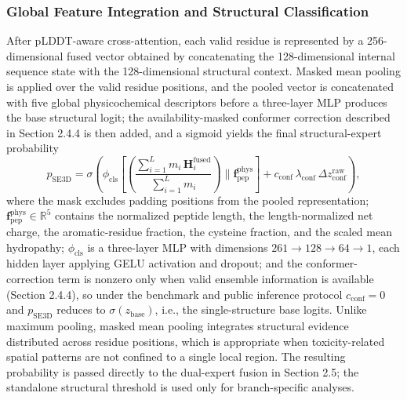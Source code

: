 \documentclass[12pt]{article}
\begin{document}
\subsubsection{Global Feature Integration and Structural Classification}
After pLDDT-aware cross-attention, each valid residue is represented by a
256-dimensional fused vector obtained by concatenating the 128-dimensional
internal sequence state with the 128-dimensional structural context. Masked
mean pooling is applied over the valid residue positions, and the pooled
vector is concatenated with five global physicochemical descriptors before a
three-layer MLP produces the base structural logit; the availability-masked
conformer correction described in Section 2.4.4 is then added, and a sigmoid
yields the final structural-expert probability
\begin{equation}
    p_{\mathrm{SE3D}} = \sigma\left(\phi_{\mathrm{cls}}\left[
    \left(\frac{\sum_{i=1}^{L} m_i\, \mathbf H^{\mathrm{fused}}_i}
    {\sum_{i=1}^{L} m_i}\right) \parallel
    \mathbf f_{\mathrm{pep}}^{\mathrm{phys}}\right] +
    c_{\mathrm{conf}}\, \lambda_{\mathrm{conf}}\,
    \Delta z_{\mathrm{conf}}^{\mathrm{raw}}\right),
    \label{eq:se3d_prob}
\end{equation}
where the mask excludes padding positions from the pooled representation;
$\mathbf f_{\mathrm{pep}}^{\mathrm{phys}} \in \mathbb{R}^{5}$ contains the
normalized peptide length, the length-normalized net charge, the
aromatic-residue fraction, the cysteine fraction, and the scaled mean
hydropathy; $\phi_{\mathrm{cls}}$ is a three-layer MLP with dimensions
$261 \rightarrow 128 \rightarrow 64 \rightarrow 1$, each hidden layer applying
GELU activation and dropout; and the conformer-correction term is nonzero
only when valid ensemble information is available (Section 2.4.4), so under
the benchmark and public inference protocol $c_{\mathrm{conf}} = 0$ and
$p_{\mathrm{SE3D}}$ reduces to $\sigma(z_{\mathrm{base}})$, i.e., the
single-structure base logits. Unlike maximum pooling, masked mean pooling
integrates structural evidence distributed across residue positions, which is
appropriate when toxicity-related spatial patterns are not confined to a
single local region. The resulting probability is passed directly to the
dual-expert fusion in Section 2.5; the standalone structural threshold is used
only for branch-specific analyses.
\end{document}
